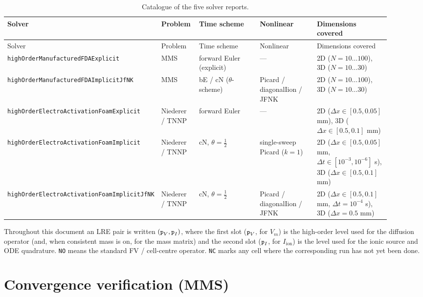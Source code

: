 \documentclass[11pt,a4paper]{article}
\newcommand{\Vm}{V_{m}}
\newcommand{\Iion}{I_{\text{ion}}}
\newcommand{\code}[1]{\texttt{\small #1}}
\begin{document}
\begin{center}\footnotesize
\begin{longtable}{p{0.27\linewidth}p{0.10\linewidth}p{0.18\linewidth}p{0.16\linewidth}p{0.20\linewidth}}
\caption{Catalogue of the five solver reports.}\\
\toprule
Solver & Problem & Time scheme & Nonlinear & Dimensions covered \\
\midrule\endfirsthead\toprule
Solver & Problem & Time scheme & Nonlinear & Dimensions covered \\
\midrule\endhead
\code{highOrderManufacturedFDAExplicit}     & MMS  & forward Euler (explicit) & ---                                        & 2D ($N=10\!\dots\!100$), 3D ($N=10\!\dots\!30$) \\
\code{highOrderManufacturedFDAImplicitJfNK} & MMS  & bE / cN ($\theta$-scheme)& Picard / diagonalIion / JFNK               & 2D ($N=10\!\dots\!100$), 3D ($N=10\!\dots\!30$) \\
\code{highOrderElectroActivationFoamExplicit}     & Niederer / TNNP & forward Euler & ---                       & 2D ($\Delta x\!\in\![0.5,0.05]$ mm), 3D ($\Delta x\!\in\![0.5,0.1]$ mm) \\
\code{highOrderElectroActivationFoamImplicit}     & Niederer / TNNP & cN, $\theta=\tfrac{1}{2}$ & single-sweep Picard ($k=1$) & 2D ($\Delta x\!\in\![0.5,0.05]$ mm, $\Delta t\!\in\![10^{-3},10^{-6}]$ s), 3D ($\Delta x\!\in\![0.5,0.1]$ mm) \\
\code{highOrderElectroActivationFoamImplicitJfNK} & Niederer / TNNP & cN, $\theta=\tfrac{1}{2}$ & Picard / diagonalIion / JFNK & 2D ($\Delta x\!\in\![0.5,0.1]$ mm, $\Delta t = 10^{-4}$ s), 3D ($\Delta x = 0.5$ mm) \\
\bottomrule
\end{longtable}\end{center}

Throughout this document an LRE pair is written
$(\code{p}_V, \code{p}_I)$, where the first slot
($\code{p}_V$, for $\Vm$) is the high-order level used for the
diffusion operator (and, when consistent mass is on, for the mass
matrix) and the second slot ($\code{p}_I$, for $\Iion$) is the level
used for the ionic source and ODE quadrature. \code{NO} means the standard FV / cell-centre operator.
\code{NC} marks any cell where the corresponding run has not yet been
done.

\section{Convergence verification (MMS)}
\label{sec:mms}
\end{document}
